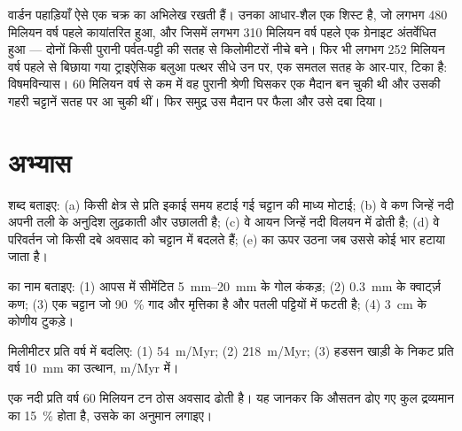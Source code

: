 वार्डन पहाड़ियाँ ऐसे एक चक्र का अभिलेख रखती हैं। उनका आधार-शैल एक शिस्ट है,
जो लगभग 480 मिलियन वर्ष पहले कायांतरित हुआ, और जिसमें लगभग 310 मिलियन वर्ष पहले
एक ग्रेनाइट अंतर्वेधित हुआ --- दोनों किसी पुरानी पर्वत-पट्टी की सतह से किलोमीटरों नीचे
बने। फिर भी लगभग 252
मिलियन वर्ष पहले से बिछाया गया ट्राइऐसिक बलुआ पत्थर सीधे उन पर, एक समतल सतह के आर-पार, टिका है:
विषमविन्यास। 60 मिलियन वर्ष से कम में वह पुरानी श्रेणी घिसकर
एक मैदान बन चुकी थी और उसकी गहरी चट्टानें सतह पर आ चुकी थीं। फिर समुद्र
उस मैदान पर फैला और उसे दबा दिया।

\section{अभ्यास}

\begin{exercise}[$\star$]\label{exo:g12:destruction-of-mountains:1}
शब्द बताइए: (a) किसी क्षेत्र से प्रति इकाई समय हटाई गई चट्टान की माध्य
मोटाई; (b) वे कण जिन्हें नदी अपनी तली के अनुदिश लुढ़काती और उछालती है; (c) वे
आयन जिन्हें नदी विलयन में ढोती है; (d) वे परिवर्तन जो किसी दबे अवसाद को
चट्टान में बदलते हैं; (e)  का ऊपर उठना जब उससे कोई भार हटाया जाता है।
\end{exercise}

\begin{exercise}[$\star$]\label{exo:g12:destruction-of-mountains:2}
 का नाम बताइए: (1) आपस में सीमेंटित \qtyrange{5}{20}{mm} के गोल
कंकड़; (2) \qty{0.3}{mm} के क्वार्ट्ज़ कण; (3) एक चट्टान जो
\qty{90}{\percent} गाद और मृत्तिका है और पतली पट्टियों में फटती है; (4) \qty{3}{cm} के
कोणीय टुकड़े।
\end{exercise}

\begin{exercise}[$\star$]\label{exo:g12:destruction-of-mountains:3}
मिलीमीटर प्रति वर्ष में बदलिए: (1) \qty{54}{m/Myr}; (2) \qty{218}{m/Myr};
(3) हडसन खाड़ी के निकट प्रति वर्ष \qty{10}{mm} का उत्थान, \unit{m/Myr} में।
\end{exercise}

\begin{exercise}[$\star$]\label{exo:g12:destruction-of-mountains:4}
एक नदी प्रति वर्ष 60 मिलियन टन ठोस अवसाद ढोती है। यह जानकर कि 
औसतन ढोए गए कुल द्रव्यमान का \qty{15}{\percent} होता है,
उसके  का अनुमान लगाइए।
\end{exercise}

